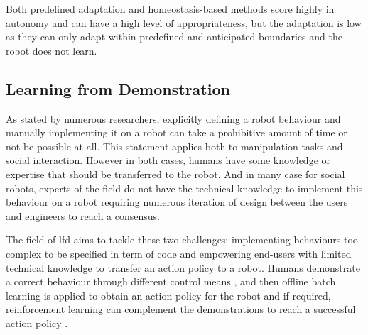 	Both predefined adaptation and homeostasis-based methods score highly in autonomy and can have a high level of appropriateness, but the adaptation is low as they can only adapt within predefined and anticipated boundaries and the robot does not learn.

\subsection{Learning from Demonstration} \label{ssec:back_lfd}
	As stated by numerous researchers, explicitly defining a robot behaviour and manually implementing it on a robot can take a prohibitive amount of time or not be possible at all. This statement applies both to manipulation tasks and social interaction. However in both cases, humans have some knowledge or expertise that should be transferred to the robot. And in many case for social robots, experts of the field do not have the technical knowledge to implement this behaviour on a robot requiring numerous iteration of design between the users and engineers to reach a consensus. 
	
	    
	The field of \acrfull{lfd} aims to tackle these two challenges: implementing behaviours too complex to be specified in term of code and empowering end-users with limited technical knowledge to transfer an action policy to a robot. Humans demonstrate a correct behaviour through different control means \citep{argall2009survey}, and then offline batch learning is applied to obtain an action policy for the robot and if required, reinforcement learning can complement the demonstrations to reach a successful action policy \citep{billard2008robot}.
	
